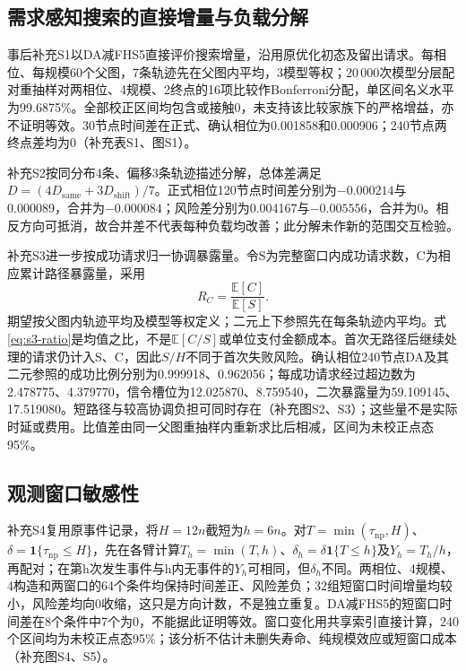 \subsection{需求感知搜索的直接增量与负载分解}

事后补充S1以DA减FHS5直接评价搜索增量，沿用原优化初态及留出请求。每相位、每规模60个父图，7条轨迹先在父图内平均，3模型等权；20\,000次模型分层配对重抽样对两相位、4规模、2终点的16项比较作Bonferroni分配，单区间名义水平为99.6875\%。全部校正区间均包含或接触0，未支持该比较家族下的严格增益，亦不证明等效。30节点时间差在正式、确认相位为0.001858和0.000906；240节点两终点差均为0（补充表S1、图S1）。

补充S2按同分布4条、偏移3条轨迹描述分解，总体差满足$D=(4D_{\mathrm{same}}+3D_{\mathrm{shift}})/7$。正式相位120节点时间差分别为$-0.000214$与0.000089，合并为$-0.000084$；风险差分别为0.004167与$-0.005556$，合并为0。相反方向可抵消，故合并差不代表每种负载均改善；此分解未作新的范围交互检验。

补充S3进一步按成功请求归一协调暴露量。令S为完整窗口内成功请求数，C为相应累计路径暴露量，采用
\begin{equation}
R_C=\frac{\mathbb E[C]}{\mathbb E[S]}.
\label{eq:s3-ratio}
\end{equation}
期望按父图内轨迹平均及模型等权定义；二元上下参照先在每条轨迹内平均。式\ref{eq:s3-ratio}是均值之比，不是$\mathbb E[C/S]$或单位支付金额成本。首次无路径后继续处理的请求仍计入S、C，因此$S/H$不同于首次失败风险。确认相位240节点DA及其二元参照的成功比例分别为0.999918、0.962056；每成功请求经过超边数为2.478775、4.379770，信令槽位为12.025870、8.759540，二次暴露量为59.109145、17.519080。短路径与较高协调负担可同时存在（补充图S2、S3）；这些量不是实际时延或费用。比值差由同一父图重抽样内重新求比后相减，区间为未校正点态95\%。

\subsection{观测窗口敏感性}

补充S4复用原事件记录，将$H=12n$截短为$h=6n$。对$T=\min(\tau_{\mathrm{np}},H)$、$\delta=\mathbf1\{\tau_{\mathrm{np}}\leq H\}$，先在各臂计算$T_h=\min(T,h)$、$\delta_h=\delta\mathbf1\{T\leq h\}$及$Y_h=T_h/h$，再配对；在第h次发生事件与h内无事件的$Y_h$可相同，但$\delta_h$不同。两相位、4规模、4构造和两窗口的64个条件均保持时间差正、风险差负；32组短窗口时间增量均较小，风险差均向0收缩，这只是方向计数，不是独立重复。DA减FHS5的短窗口时间差在8个条件中7个为0，不能据此证明等效。窗口变化用共享索引直接计算，240个区间均为未校正点态95\%；该分析不估计未删失寿命、纯规模效应或短窗口成本（补充图S4、S5）。
